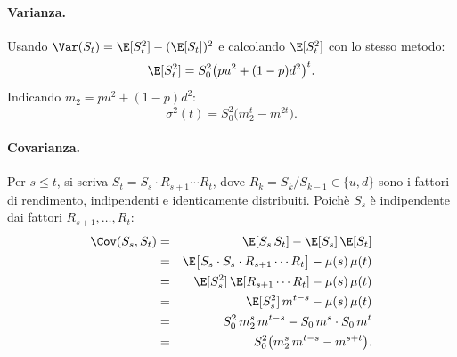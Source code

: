 \paragraph{Varianza.}
Usando $\Var(S_t)=\E[S_t^2]-(\E[S_t])^2$ e calcolando $\E[S_t^2]$
con lo stesso metodo:
\[
\E[S_t^2]=S_0^2\bigl(pu^2+(1-p)d^2\bigr)^t.
\]
Indicando $m_2=pu^2+(1-p)d^2$:
\[
\sigma^2(t)=S_0^2\bigl(m_2^t-m^{2t}\bigr).
\]

\paragraph{Covarianza.}
Per $s\leq t$, si scriva $S_t=S_s\cdot R_{s+1}\cdots R_t$, dove
$R_k=S_k/S_{k-1}\in\{u,d\}$ sono i fattori di rendimento, indipendenti
e identicamente distribuiti. Poich\`{e} $S_s$ \`{e} indipendente dai
fattori $R_{s+1},\ldots,R_t$:
\begin{eqnarray*}
\Cov(S_s,S_t)
&=& \E[S_s\,S_t]-\E[S_s]\,\E[S_t]\\
&=& \E\bigl[S_s\cdot S_s\cdot R_{s+1}\cdots R_t\bigr]
    -\mu(s)\,\mu(t)\\
&=& \E[S_s^2]\,\E[R_{s+1}\cdots R_t]
    -\mu(s)\,\mu(t)\\
&=& \E[S_s^2]\,m^{t-s}-\mu(s)\,\mu(t)\\
&=& S_0^2\,m_2^s\,m^{t-s}
    -S_0\,m^s\cdot S_0\,m^t\\
&=& S_0^2\bigl(m_2^s\,m^{t-s}-m^{s+t}\bigr).
\end{eqnarray*}

